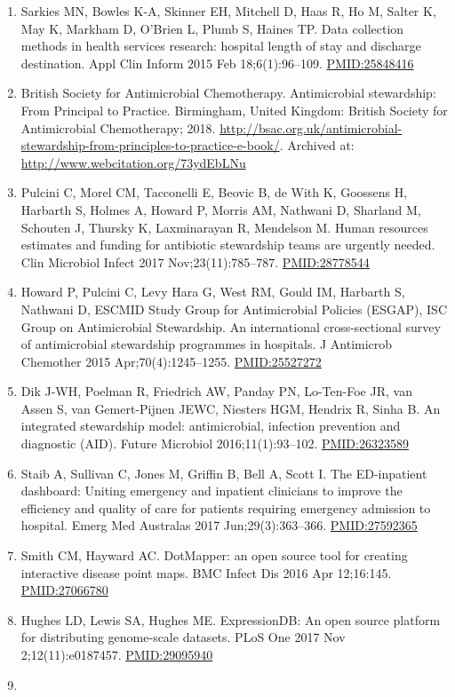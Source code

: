 \documentclass[
]{book}
\begin{document}
\begin{enumerate}
\item
  Sarkies MN, Bowles K-A, Skinner EH, Mitchell D, Haas R, Ho M, Salter K, May K, Markham D, O'Brien L, Plumb S, Haines TP. Data collection methods in health services research: hospital length of stay and discharge destination. Appl Clin Inform 2015 Feb 18;6(1):96--109. \url{PMID:25848416}
\item
  British Society for Antimicrobial Chemotherapy. Antimicrobial stewardship: From Principal to Practice. Birmingham, United Kingdom: British Society for Antimicrobial Chemotherapy; 2018. \url{http://bsac.org.uk/antimicrobial-stewardship-from-principles-to-practice-e-book/}. Archived at: \url{http://www.webcitation.org/73ydEbLNu}
\item
  Pulcini C, Morel CM, Tacconelli E, Beovic B, de With K, Goossens H, Harbarth S, Holmes A, Howard P, Morris AM, Nathwani D, Sharland M, Schouten J, Thursky K, Laxminarayan R, Mendelson M. Human resources estimates and funding for antibiotic stewardship teams are urgently needed. Clin Microbiol Infect 2017 Nov;23(11):785--787. \url{PMID:28778544}
\item
  Howard P, Pulcini C, Levy Hara G, West RM, Gould IM, Harbarth S, Nathwani D, ESCMID Study Group for Antimicrobial Policies (ESGAP), ISC Group on Antimicrobial Stewardship. An international cross-sectional survey of antimicrobial stewardship programmes in hospitals. J Antimicrob Chemother 2015 Apr;70(4):1245--1255. \url{PMID:25527272}
\item
  Dik J-WH, Poelman R, Friedrich AW, Panday PN, Lo-Ten-Foe JR, van Assen S, van Gemert-Pijnen JEWC, Niesters HGM, Hendrix R, Sinha B. An integrated stewardship model: antimicrobial, infection prevention and diagnostic (AID). Future Microbiol 2016;11(1):93--102. \url{PMID:26323589}
\item
  Staib A, Sullivan C, Jones M, Griffin B, Bell A, Scott I. The ED-inpatient dashboard: Uniting emergency and inpatient clinicians to improve the efficiency and quality of care for patients requiring emergency admission to hospital. Emerg Med Australas 2017 Jun;29(3):363--366. \url{PMID:27592365}
\item
  Smith CM, Hayward AC. DotMapper: an open source tool for creating interactive disease point maps. BMC Infect Dis 2016 Apr 12;16:145. \url{PMID:27066780}
\item
  Hughes LD, Lewis SA, Hughes ME. ExpressionDB: An open source platform for distributing genome-scale datasets. PLoS One 2017 Nov 2;12(11):e0187457. \url{PMID:29095940}
\item

\end{enumerate}
\end{document}
